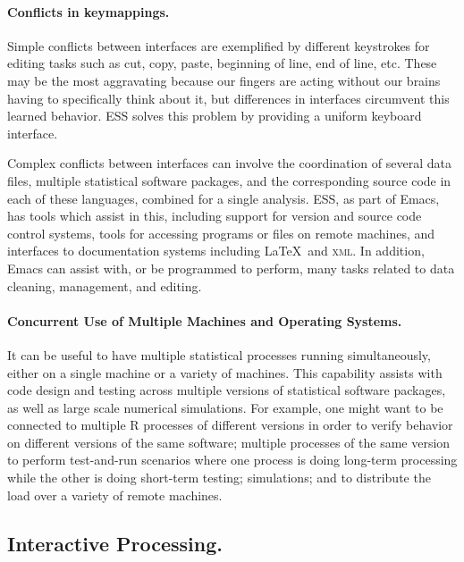 \documentclass{article}
\begin{document}
\paragraph{Conflicts in keymappings.}
\label{sec:confl-keym}

Simple conflicts between interfaces are exemplified by different
keystrokes for editing tasks such as cut, copy, paste, beginning of
line, end of line, etc.  These may be the most aggravating
because our fingers are acting without our brains having to
specifically think about it, but differences in interfaces
circumvent this learned behavior.  ESS solves this problem by
providing a uniform keyboard interface.

Complex conflicts between interfaces can involve the coordination of
several data files, multiple statistical software packages, and the
corresponding source code in each of these languages, combined for a
single analysis.  ESS, as part of Emacs, has tools which assist in
this, including support for version and source code control systems,
tools for accessing programs or files on remote machines, and
interfaces to documentation systems including \LaTeX\ and
\textsc{xml}.  In addition, Emacs can assist with, or be programmed to
perform, many tasks related to data cleaning, management, and editing.


\paragraph{Concurrent Use of Multiple Machines and Operating Systems.}
\label{sec:conc-use-mult}

It can be useful to have multiple statistical processes running
simultaneously, either on a single machine or a variety of machines.
This capability assists with code design and testing across multiple
versions of statistical software packages, as well as large scale
numerical simulations.  For example, one might want to be connected to
multiple R processes of different versions in order to verify behavior
on different versions of the same software; multiple processes of the
same version to perform test-and-run scenarios where one process is
doing long-term processing while the other is doing short-term
testing; simulations; and to distribute the load over a variety of
remote machines.

\subsection{Interactive Processing.}
\label{sec:interactive}
\end{document}
